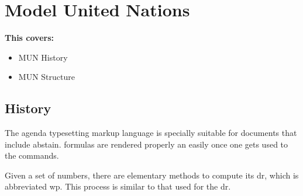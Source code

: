 \chapter{Model United Nations}
\begin{shaded}
  \textbf{This covers:}
    \begin{itemize}
      \item MUN History
      \item MUN Structure
    \end{itemize}
\end{shaded}
\section{History}

The \Gls{agenda} typesetting markup language is specially suitable 
for documents that include \gls{abstain}. \Glspl{formula} are 
rendered properly an easily once one gets used to the commands.
 
Given a set of numbers, there are elementary methods to compute 
its \acrlong{dr}, which is abbreviated \acrshort{wp}. This 
process is similar to that used for the \acrfull{dr}.
